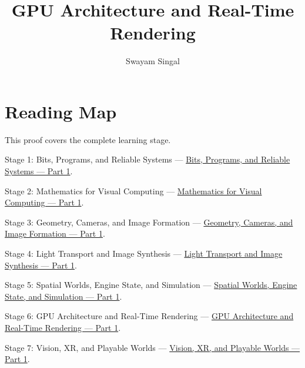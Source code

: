 \documentclass[11pt,twoside,openany]{book}
\title{GPU Architecture and Real-Time Rendering}
\author{Swayam Singal}
\begin{document}
\maketitle
\begin{center}\end{center}
\chapter*{Reading Map}
\hypertarget{volume-reading-map}{}
\noindent This proof covers the complete learning stage.
\par\noindent Stage 1: Bits, Programs, and Reliable Systems --- \href{../01-Bits-Programs-and-Reliable-Systems-P01/main.pdf}{Bits, Programs, and Reliable Systems — Part 1}.
\par\noindent Stage 2: Mathematics for Visual Computing --- \href{../02-Mathematics-for-Visual-Computing-P01/main.pdf}{Mathematics for Visual Computing — Part 1}.
\par\noindent Stage 3: Geometry, Cameras, and Image Formation --- \href{../03-Geometry-Cameras-and-Image-Formation-P01/main.pdf}{Geometry, Cameras, and Image Formation — Part 1}.
\par\noindent Stage 4: Light Transport and Image Synthesis --- \href{../04-Light-Transport-and-Image-Synthesis-P01/main.pdf}{Light Transport and Image Synthesis — Part 1}.
\par\noindent Stage 5: Spatial Worlds, Engine State, and Simulation --- \href{../05-Spatial-Worlds-Engine-State-and-Simulation-P01/main.pdf}{Spatial Worlds, Engine State, and Simulation — Part 1}.
\par\noindent Stage 6: GPU Architecture and Real-Time Rendering --- \href{../06-GPU-Architecture-and-Real-Time-Rendering-P01/main.pdf}{GPU Architecture and Real-Time Rendering — Part 1}.
\par\noindent Stage 7: Vision, XR, and Playable Worlds --- \href{../07-Vision-XR-and-Playable-Worlds-P01/main.pdf}{Vision, XR, and Playable Worlds — Part 1}.
\tableofcontents
\mainmatter
\setcounter{chapter}{0}




\end{document}
